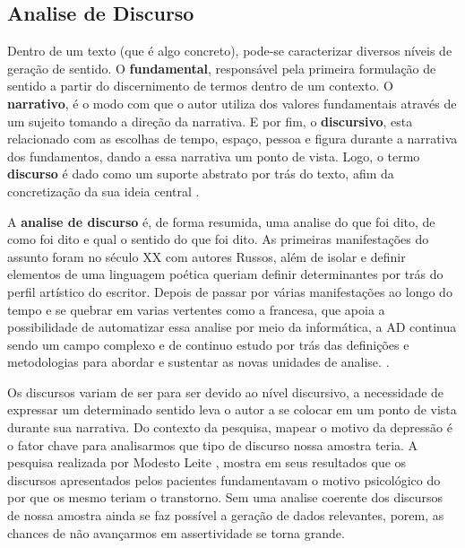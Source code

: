 \subsection{Analise de Discurso}
Dentro de um texto (que é algo concreto), pode-se caracterizar diversos níveis de geração de sentido. O \textbf{fundamental}, responsável pela primeira formulação de sentido a partir do discernimento de termos dentro de um contexto. O \textbf{narrativo}, é o modo com que o autor utiliza dos valores fundamentais através de um sujeito tomando a direção da narrativa. E por fim, o \textbf{discursivo}, esta relacionado com as escolhas de tempo, espaço, pessoa e figura durante a narrativa dos fundamentos, dando a essa narrativa um ponto de vista. Logo, o termo \textbf{discurso} é dado como um suporte abstrato por trás do texto, afim da concretização da sua ideia central \cite[13-17]{gregolin1995ad}.

A \textbf{analise de discurso} é, de forma resumida, uma analise do que foi dito, de como foi dito e qual o sentido do que foi dito. As primeiras manifestações do assunto foram no século XX com autores Russos, além de isolar e definir elementos de uma linguagem poética queriam definir determinantes por trás do perfil artístico do escritor. Depois de passar por várias manifestações ao longo do tempo e se quebrar em varias vertentes como a francesa, que apoia a possibilidade de automatizar essa analise por meio da informática, a AD continua sendo um campo complexo e de continuo estudo por trás das definições e metodologias para abordar e sustentar as novas unidades de analise. \cite[22]{souza2006ad}.

Os discursos variam de ser para ser devido ao nível discursivo, a necessidade de expressar um determinado sentido leva o autor a se colocar em um ponto de vista durante sua narrativa. Do contexto da pesquisa, mapear o motivo da depressão é o fator chave para analisarmos que tipo de discurso nossa amostra teria. A pesquisa realizada por Modesto Leite \cite[134]{modesto2005adepre}, mostra em seus resultados que os discursos apresentados pelos pacientes fundamentavam o motivo psicológico do por que os mesmo teriam o transtorno. Sem uma analise coerente dos discursos de nossa amostra ainda se faz possível a geração de dados relevantes, porem, as chances de não avançarmos em assertividade se torna grande.
